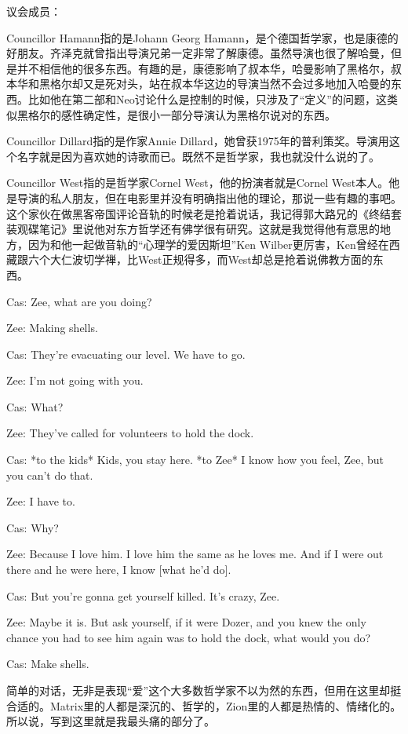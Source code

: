 \documentclass[UTF8]{ctexart}
\newenvironment{myquote}{\color{green} \setlength{\leftskip}{6em} \setlength{\rightskip}{4em} \setlength{\parindent}{-2em}}{\par}
\begin{document}
议会成员：

Councillor Hamann指的是Johann Georg Hamann，是个德国哲学家，也是康德的好朋友。齐泽克就曾指出导演兄弟一定非常了解康德。虽然导演也很了解哈曼，但是并不相信他的很多东西。有趣的是，康德影响了叔本华，哈曼影响了黑格尔，叔本华和黑格尔却又是死对头，站在叔本华这边的导演当然不会过多地加入哈曼的东西。比如他在第二部和Neo讨论什么是控制的时候，只涉及了“定义”的问题，这类似黑格尔的感性确定性，是很小一部分导演认为黑格尔说对的东西。

Councillor Dillard指的是作家Annie Dillard，她曾获1975年的普利策奖。导演用这个名字就是因为喜欢她的诗歌而已。既然不是哲学家，我也就没什么说的了。

Councillor West指的是哲学家Cornel West，他的扮演者就是Cornel West本人。他是导演的私人朋友，但在电影里并没有明确指出他的理论，那说一些有趣的事吧。这个家伙在做黑客帝国评论音轨的时候老是抢着说话，我记得郭大路兄的《终结套装观碟笔记》里说他对东方哲学还有佛学很有研究。这就是我觉得他有意思的地方，因为和他一起做音轨的“心理学的爱因斯坦”Ken Wilber更厉害，Ken曾经在西藏跟六个大仁波切学禅，比West正规得多，而West却总是抢着说佛教方面的东西。

\begin{myquote}
Cas: Zee, what are you doing?

Zee: Making shells.

Cas: They're evacuating our level. We have to go.

Zee: I'm not going with you.

Cas: What?

Zee: They've called for volunteers to hold the dock.

Cas: *to the kids* Kids, you stay here. *to Zee* I know how you feel, Zee, but you can't do that.

Zee: I have to.

Cas: Why?

Zee: Because I love him. I love him the same as he loves me. And if I were out there and he were here, I know [what he'd do].

Cas: But you're gonna get yourself killed. It's crazy, Zee.

Zee: Maybe it is. But ask yourself, if it were Dozer, and you knew the only chance you had to see him again was to hold the dock, what would you do?

Cas: Make shells.
\end{myquote}

简单的对话，无非是表现“爱”这个大多数哲学家不以为然的东西，但用在这里却挺合适的。Matrix里的人都是深沉的、哲学的，Zion里的人都是热情的、情绪化的。所以说，写到这里就是我最头痛的部分了。
\end{document}
